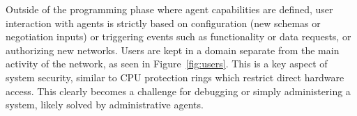 Outside of the programming phase where agent capabilities are defined, user interaction with agents is strictly based on configuration (new schemas or negotiation inputs) or triggering events such as functionality or data requests, or authorizing new networks.
Users are kept in a domain separate from the main activity of the network, as seen in Figure~\ref{fig:users}.
This is a key aspect of system security, similar to CPU protection rings which restrict direct hardware access.
This clearly becomes a challenge for debugging or simply administering a system, likely solved by administrative agents.

\begin{ppl}

\end{ppl}